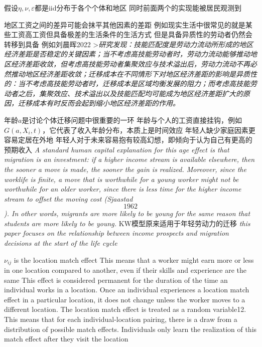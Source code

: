 \documentclass[a4paper,10pt]{article}
\begin{document}
假设$\eta,\nu,\varepsilon$都是iid分布于各个个体和地区
同时前面两个的实现能被居民观测到

地区工资之间的差异可能会抹平其他因素的差距 
例如现实生活中很常见的就是某些工资高工资但具备极差的生活条件的生活方式
但是具备异质性的劳动者仍然会转移到具备
例如刘晨晖2022
>\textit{研究发现：技能匹配度是劳动力流动所形成的地区经济差距是否稳定的关键因素；当不考虑高技能劳动者时，劳动力流动能够推动地区经济差距收敛，但考虑高技能劳动者集聚效应与技术溢出后，劳动力流动不再必然推动地区经济差距收敛；迁移成本在不同情形下对地区经济差距的影响是异质性的：当不考虑高技能劳动者时，迁移成本是区域均衡发展的阻力；而考虑高技能劳动者之后，集聚效应、技术溢出以及技能匹配均可能成为地区经济差距扩大的原因，迁移成本有时反而会起到缩小地区经济差距的作用。}

年龄$a$是讨论个体迁移问题中很重要的一环
年龄与个人的工资直接挂钩，例如$G(a,X_i,t)$，它代表了收入年龄分布，本质上是时间效应
年轻人缺少家庭因素更容易定居在外地
年轻人对于未来容易抱有较高幻想，即倾向于认为自己有更高的预期收入
\textit{A standard human capital explanation for this age effect is that migration is an investment: if a higher income stream is  available elsewhere, then the sooner a move is made, the sooner the gain is realized. Moreover,  since the worklife is finite, a move that is worthwhile for a young worker might not be  worthwhile for an older worker, since there is less time for the higher income stream to offset  the moving cost (Sjaastad \[1962\]). In other words, migrants are more likely to be young for the same reason that students are more likely to be young.}
KW模型原来适用于年轻劳动力的迁移
\textit{this paper focuses on the relationship between income prospects and migration decisions at the start of the life cycle}




$\nu_{ij}$ is the location match effect
This means that a worker might earn more or less in one location compared to another, even if their skills and experience are the same
This effect is considered permanent for the duration of the time an individual works in a location. Once an individual experiences a location match effect in a particular location, it does not change unless the worker moves to a different location.
The location match effect is treated as a random variable12. This means that for each individual-location pairing, there is a draw from a distribution of possible match effects. Individuals only learn the realization of this match effect after they visit the location
\end{document}
